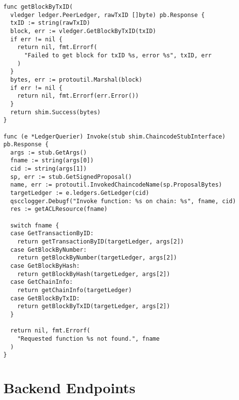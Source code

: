 \begin{verbatim}
func getBlockByTxID(
  vledger ledger.PeerLedger, rawTxID []byte) pb.Response {
  txID := string(rawTxID)
  block, err := vledger.GetBlockByTxID(txID)
  if err != nil {
    return nil, fmt.Errorf(
      "Failed to get block for txID %s, error %s", txID, err
    )
  }
  bytes, err := protoutil.Marshal(block)
  if err != nil {
    return nil, fmt.Errorf(err.Error())
  }
  return shim.Success(bytes)
}

func (e *LedgerQuerier) Invoke(stub shim.ChaincodeStubInterface) pb.Response {
  args := stub.GetArgs()
  fname := string(args[0])
  cid := string(args[1])
  sp, err := stub.GetSignedProposal()
  name, err := protoutil.InvokedChaincodeName(sp.ProposalBytes)
  targetLedger := e.ledgers.GetLedger(cid)
  qscclogger.Debugf("Invoke function: %s on chain: %s", fname, cid)
  res := getACLResource(fname)

  switch fname {
  case GetTransactionByID:
    return getTransactionByID(targetLedger, args[2])
  case GetBlockByNumber:
    return getBlockByNumber(targetLedger, args[2])
  case GetBlockByHash:
    return getBlockByHash(targetLedger, args[2])
  case GetChainInfo:
    return getChainInfo(targetLedger)
  case GetBlockByTxID:
    return getBlockByTxID(targetLedger, args[2])
  }

  return nil, fmt.Errorf(
    "Requested function %s not found.", fname
  )
}
\end{verbatim}


\section{Backend Endpoints}{} %
\label{app:endpoints}

